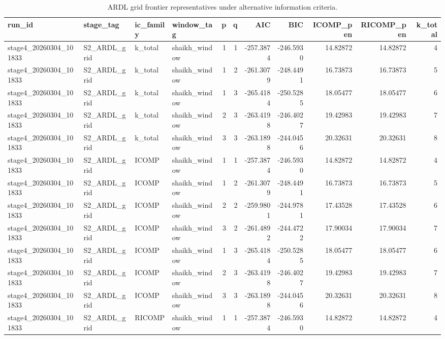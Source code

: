 \begin{table}[!h]
\centering
\caption{ARDL grid frontier representatives under alternative information criteria.}
\centering
\begin{threeparttable}
\begin{tabular}[t]{llllrrrrrrr}
\toprule
run\_id & stage\_tag & ic\_family & window\_tag & p & q & AIC & BIC & ICOMP\_pen & RICOMP\_pen & k\_total\\
\midrule
stage4\_20260304\_101833 & S2\_ARDL\_grid & k\_total & shaikh\_window & 1 & 1 & -257.3874 & -246.5930 & 14.82872 & 14.82872 & 4\\
stage4\_20260304\_101833 & S2\_ARDL\_grid & k\_total & shaikh\_window & 1 & 2 & -261.3079 & -248.4491 & 16.73873 & 16.73873 & 5\\
stage4\_20260304\_101833 & S2\_ARDL\_grid & k\_total & shaikh\_window & 1 & 3 & -265.4184 & -250.5285 & 18.05477 & 18.05477 & 6\\
stage4\_20260304\_101833 & S2\_ARDL\_grid & k\_total & shaikh\_window & 2 & 3 & -263.4198 & -246.4027 & 19.42983 & 19.42983 & 7\\
stage4\_20260304\_101833 & S2\_ARDL\_grid & k\_total & shaikh\_window & 3 & 3 & -263.1898 & -244.0456 & 20.32631 & 20.32631 & 8\\
\addlinespace
stage4\_20260304\_101833 & S2\_ARDL\_grid & ICOMP & shaikh\_window & 1 & 1 & -257.3874 & -246.5930 & 14.82872 & 14.82872 & 4\\
stage4\_20260304\_101833 & S2\_ARDL\_grid & ICOMP & shaikh\_window & 1 & 2 & -261.3079 & -248.4491 & 16.73873 & 16.73873 & 5\\
stage4\_20260304\_101833 & S2\_ARDL\_grid & ICOMP & shaikh\_window & 2 & 2 & -259.9801 & -244.9781 & 17.43528 & 17.43528 & 6\\
stage4\_20260304\_101833 & S2\_ARDL\_grid & ICOMP & shaikh\_window & 3 & 2 & -261.4892 & -244.4722 & 17.90034 & 17.90034 & 7\\
stage4\_20260304\_101833 & S2\_ARDL\_grid & ICOMP & shaikh\_window & 1 & 3 & -265.4184 & -250.5285 & 18.05477 & 18.05477 & 6\\
\addlinespace
stage4\_20260304\_101833 & S2\_ARDL\_grid & ICOMP & shaikh\_window & 2 & 3 & -263.4198 & -246.4027 & 19.42983 & 19.42983 & 7\\
stage4\_20260304\_101833 & S2\_ARDL\_grid & ICOMP & shaikh\_window & 3 & 3 & -263.1898 & -244.0456 & 20.32631 & 20.32631 & 8\\
stage4\_20260304\_101833 & S2\_ARDL\_grid & RICOMP & shaikh\_window & 1 & 1 & -257.3874 & -246.5930 & 14.82872 & 14.82872 & 4\\

\end{tabular}
\end{threeparttable}
\end{table}
